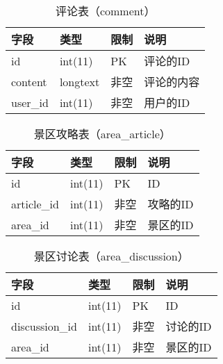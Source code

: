             \begin{table}[htbp]
                \caption{\wuhao 评论表（comment）}
                \vspace{0.5em}\centering\wuhao
                \begin{tabular}{llll}
                    \toprule[1.5pt]
                    字段 & 类型 & 限制 & 说明\\
                    \midrule[1pt]
                    id & int(11) & PK & 评论的ID\\
                    content & longtext & 非空 & 评论的内容\\
                    user\_id & int(11) & 非空 & 用户的ID\\
                    \bottomrule[1.5pt]
                \end{tabular}
            \end{table}

            \begin{table}[htbp]
                \caption{\wuhao 景区攻略表（area\_article）}
                \vspace{0.5em}\centering\wuhao
                \begin{tabular}{llll}
                    \toprule[1.5pt]
                    字段 & 类型 & 限制 & 说明\\
                    \midrule[1pt]
                    id & int(11) & PK & ID\\
                    article\_id & int(11) & 非空 & 攻略的ID\\
                    area\_id & int(11) & 非空 & 景区的ID\\
                    \bottomrule[1.5pt]
                \end{tabular}
            \end{table}

            \begin{table}[htbp]
                \caption{\wuhao 景区讨论表（area\_discussion）}
                \vspace{0.5em}\centering\wuhao
                \begin{tabular}{llll}
                    \toprule[1.5pt]
                    字段 & 类型 & 限制 & 说明\\
                    \midrule[1pt]
                    id & int(11) & PK & ID\\
                    discussion\_id & int(11) & 非空 & 讨论的ID\\
                    area\_id & int(11) & 非空 & 景区的ID\\
                    \bottomrule[1.5pt]
                \end{tabular}
            \end{table}

